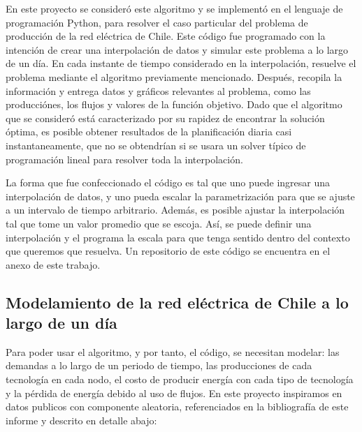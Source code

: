 \documentclass[12pt,twoside]{article}
\begin{document}
	\hspace{1cm} En este proyecto se consider\'o este algoritmo y se implement\'o en el lenguaje de programaci\'on Python, para resolver el caso particular del problema de producci\'on de la red el\'ectrica de Chile. Este c\'odigo fue programado con la intenci\'on de crear una interpolaci\'on de datos y simular este problema a lo largo de un d\'ia. En cada instante de tiempo considerado en la interpolaci\'on, resuelve el problema mediante el algoritmo previamente mencionado. Despu\'es, recopila la informaci\'on y entrega datos y gr\'aficos relevantes al problema, como las producci\'ones, los flujos y valores de la funci\'on objetivo. Dado que el algoritmo que se consider\'o est\'a caracterizado por su rapidez de encontrar la soluci\'on \'optima, es posible obtener resultados de la planificaci\'on diaria casi instantaneamente, que no se obtendr\'ian si se usara un solver t\'ipico de programaci\'on lineal para resolver toda la interpolaci\'on.
	
	\hspace{1cm} La forma que fue confeccionado el c\'odigo es tal que uno puede ingresar una interpolaci\'on de datos, y uno pueda escalar la parametrizaci\'on para que se ajuste a un intervalo de tiempo arbitrario. Adem\'as, es posible ajustar la interpolaci\'on tal que tome un valor promedio que se escoja. As\'i, se puede definir una interpolaci\'on y el programa la escala para que tenga sentido dentro del contexto que queremos que resuelva. Un repositorio de este c\'odigo se encuentra en el anexo de este trabajo.
	
	\subsection{Modelamiento de la red el\'ectrica de Chile a lo largo de un d\'ia}
	
	\hspace{1cm} Para poder usar el algoritmo, y por tanto, el c\'odigo, se necesitan modelar: las demandas a lo largo de un periodo de tiempo, las producciones de cada tecnolog\'ia en cada nodo, el costo de producir energ\'ia con cada tipo de tecnolog\'ia y la p\'erdida de energ\'ia debido al uso de flujos. En este proyecto inspiramos en datos publicos con componente aleatoria, referenciados en la bibliograf\'ia de este informe y descrito en detalle abajo:
	
\end{document}
